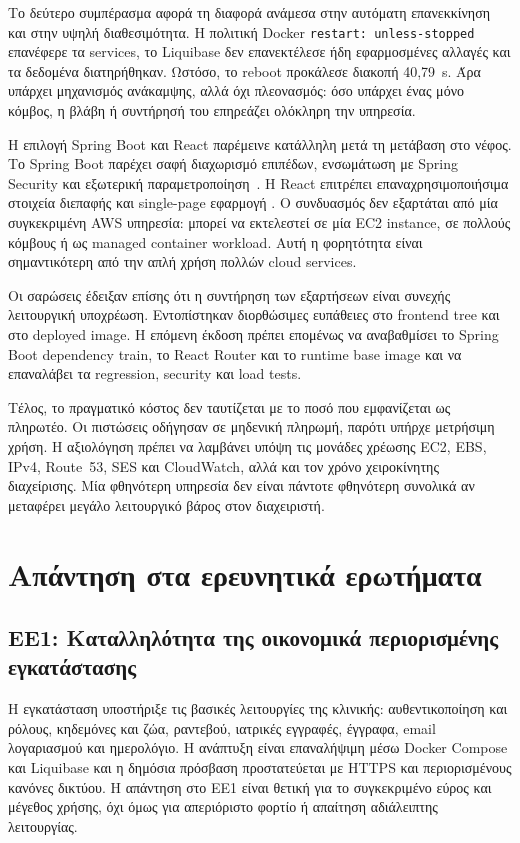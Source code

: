 Το δεύτερο συμπέρασμα αφορά τη διαφορά ανάμεσα στην αυτόματη επανεκκίνηση
και στην υψηλή διαθεσιμότητα. Η πολιτική Docker
\texttt{restart: unless-stopped} επανέφερε τα services, το Liquibase δεν
επανεκτέλεσε ήδη εφαρμοσμένες αλλαγές και τα δεδομένα διατηρήθηκαν. Ωστόσο,
το reboot προκάλεσε διακοπή 40,79~s. Άρα υπάρχει μηχανισμός ανάκαμψης, αλλά
όχι πλεονασμός: όσο υπάρχει ένας μόνο κόμβος, η βλάβη ή συντήρησή του
επηρεάζει ολόκληρη την υπηρεσία.

Η επιλογή Spring Boot και React παρέμεινε κατάλληλη μετά τη μετάβαση στο
νέφος. Το Spring Boot παρέχει σαφή διαχωρισμό επιπέδων, ενσωμάτωση με Spring
Security και εξωτερική παραμετροποίηση~\cite{spring2026boot}. Η React
επιτρέπει επαναχρησιμοποιήσιμα στοιχεία διεπαφής και single-page εφαρμογή
\cite{react2026docs}. Ο συνδυασμός δεν εξαρτάται από μία συγκεκριμένη AWS
υπηρεσία: μπορεί να εκτελεστεί σε μία EC2 instance, σε πολλούς κόμβους ή ως
managed container workload. Αυτή η φορητότητα είναι σημαντικότερη από την
απλή χρήση πολλών cloud services.

Οι σαρώσεις έδειξαν επίσης ότι η συντήρηση των εξαρτήσεων είναι συνεχής
λειτουργική υποχρέωση. Εντοπίστηκαν διορθώσιμες ευπάθειες στο frontend tree
και στο deployed image. Η επόμενη έκδοση πρέπει επομένως να αναβαθμίσει το
Spring Boot dependency train, το React Router και το runtime base image και
να επαναλάβει τα regression, security και load tests.

Τέλος, το πραγματικό κόστος δεν ταυτίζεται με το ποσό που εμφανίζεται ως
πληρωτέο. Οι πιστώσεις οδήγησαν σε μηδενική πληρωμή, παρότι υπήρχε μετρήσιμη
χρήση. Η αξιολόγηση πρέπει να λαμβάνει υπόψη τις μονάδες χρέωσης EC2, EBS,
IPv4, Route~53, SES και CloudWatch, αλλά και τον χρόνο χειροκίνητης
διαχείρισης. Μία φθηνότερη υπηρεσία δεν είναι πάντοτε φθηνότερη συνολικά αν
μεταφέρει μεγάλο λειτουργικό βάρος στον διαχειριστή.

\section{Απάντηση στα ερευνητικά ερωτήματα}
\subsection*{ΕΕ1: Καταλληλότητα της οικονομικά περιορισμένης εγκατάστασης}
Η εγκατάσταση υποστήριξε τις βασικές λειτουργίες της κλινικής:
αυθεντικοποίηση και ρόλους, κηδεμόνες και ζώα, ραντεβού, ιατρικές εγγραφές,
έγγραφα, email λογαριασμού και ημερολόγιο. Η ανάπτυξη είναι επαναλήψιμη μέσω
Docker Compose και Liquibase και η δημόσια πρόσβαση προστατεύεται με HTTPS
και περιορισμένους κανόνες δικτύου. Η απάντηση στο ΕΕ1 είναι θετική για το
συγκεκριμένο εύρος και μέγεθος χρήσης, όχι όμως για απεριόριστο φορτίο ή
απαίτηση αδιάλειπτης λειτουργίας.


